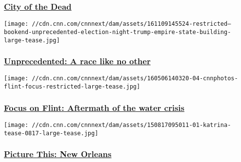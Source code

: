 \hypertarget{city-of-the-dead}{%
\subsubsection{\texorpdfstring{\href{http://www.cnn.com/interactive/2017/03/world/city-of-the-dead/}{City
of the Dead}}{City of the Dead}}\label{city-of-the-dead}}

\href{http://www.cnn.com/interactive/2016/politics/unprecedented/}{}

\texttt{[image: //cdn.cnn.com/cnnnext/dam/assets/161109145524-restricted---bookend-unprecedented-election-night-trump-empire-state-building-large-tease.jpg]}

\hypertarget{unprecedented-a-race-like-no-other}{%
\subsubsection{\texorpdfstring{\href{http://www.cnn.com/interactive/2016/politics/unprecedented/}{Unprecedented:
A race like no
other}}{Unprecedented: A race like no other}}\label{unprecedented-a-race-like-no-other}}

\href{http://www.cnn.com/interactive/2016/05/health/focus-on-flint/}{}

\texttt{[image: //cdn.cnn.com/cnnnext/dam/assets/160506140320-04-cnnphotos-flint-focus-restricted-large-tease.jpg]}

\hypertarget{focus-on-flint-aftermath-of-the-water-crisis}{%
\subsubsection{\texorpdfstring{\href{http://www.cnn.com/interactive/2016/05/health/focus-on-flint/}{Focus
on Flint: Aftermath of the water
crisis}}{Focus on Flint: Aftermath of the water crisis}}\label{focus-on-flint-aftermath-of-the-water-crisis}}

\href{http://money.cnn.com/katrina/}{}

\texttt{[image: //cdn.cnn.com/cnnnext/dam/assets/150817095011-01-katrina-tease-0817-large-tease.jpg]}

\hypertarget{picture-this-new-orleans}{%
\subsubsection{\texorpdfstring{\href{http://money.cnn.com/katrina/}{Picture
This: New
Orleans}}{Picture This: New Orleans}}\label{picture-this-new-orleans}}

\href{http://www.cnn.com/interactive/2014/07/travel/50-states-natural-wonders/index.html}{}

